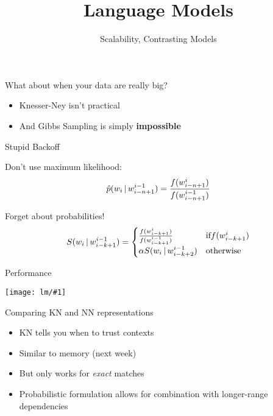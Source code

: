 \documentclass[compress]{beamer}
\title{Language Models}
\date{Scalability, Contrasting Models}
\newcommand{\gfx}[2]{
\begin{center}
	\texttt{[image: lm/\#1]}
\end{center}
}
\begin{document}
\frame{\titlepage
}


\begin{frame}{What about when your data are really big?}

  \begin{itemize}
    \item Knesser-Ney isn't practical
    \item And Gibbs Sampling is simply {\bf impossible}
  \end{itemize}

\end{frame}

\begin{frame}{Stupid Backoff}

  Don't use maximum likelihood:
  \begin{equation}
    \hat p(w_i \, | \, w_{i-n+1}^{i-1}) = \frac{f(w_{i-n+1}^i)}{f(w_{i-n+1}^{i-1})}
    \end{equation}

  Forget about probabilities!
  \begin{equation}
    S(w_i \, | \, w^{i-1}_{i-k+1}) = \begin{cases} \frac{f(w_{i-k+1}^i)}{f(w_{i-k+1}^{i-1})} & \mbox{if} f(w_{i-k+1}^i) \\
\alpha S(w_i \, | \, w_{i-k+2}^{i-1}) & \mbox{otherwise}
\end{cases}
  \end{equation}

\end{frame}

\begin{frame}{Performance}

  \gfx{stupid}{.9}

\end{frame}

\begin{frame}{Comparing KN and NN representations}

  \begin{itemize}
    \item KN tells you when to trust contexts
    \item Similar to memory (next week)
    \item But only works for \emph{exact} matches
    \item Probabilistic formulation allows for combination with longer-range dependencies
  \end{itemize}

\end{frame}
\end{document}
